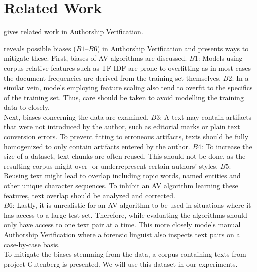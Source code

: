 \chapter{Related Work}\label{related_work}

\cite{stein2019unbiasedGutenbergCorpus} gives related work in Authorship Verification.

\cite{stein2019unbiasedGutenbergCorpus} reveals possible biases ($B1$--$B6$) in Authorship Verification and presents ways to mitigate these.
First, biases of AV algorithms are discussed.
$B1$: Models using corpus-relative features such as TF-IDF are prone to overfitting as in most cases the document frequencies are derived from the training set themselves.
$B2$: In a similar vein, models employing feature scaling also tend to overfit to the specifics of the training set.
Thus, care should be taken to avoid modelling the training data to closely.\\
Next, biases concerning the data are examined.
$B3$: A text may contain artifacts that were not introduced by the author, such as editorial marks or plain text conversion errors.
To prevent fitting to erroneous artifacts, texts should be fully homogenized to only contain artifacts entered by the author.
$B4$: To increase the size of a dataset, text chunks are often reused.
This should not be done, as the resulting corpus might over- or underrepresent certain authors' styles.
$B5$: Reusing text might lead to overlap including topic words, named entities and other unique character sequences.
To inhibit an AV algorithm learning these features, text overlap should be analyzed and corrected.\\
$B6$: Lastly, it is unrealistic for an AV algorithm to be used in situations where it has access to a large test set.
Therefore, while evaluating the algorithms should only have access to one text pair at a time.
This more closely models manual Authorship Verification where a forensic linguist also inspects text pairs on a case-by-case basis.\\
To mitigate the biases stemming from the data, a corpus containing texts from project Gutenberg is presented.
We will use this dataset in our experiments.

